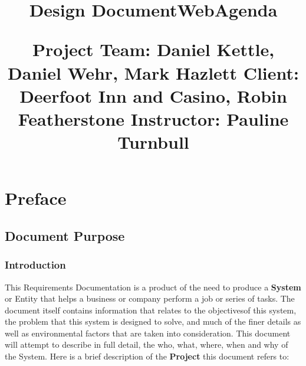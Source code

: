\documentclass[letterpaper,12pt]{report}
\begin{document}
\title{Design Document\linebreak WebAgenda\linebreak \linebreak 
	\begin{small}\textbf{Project Team:} Daniel Kettle, Daniel Wehr, Mark Hazlett\linebreak
	\textbf{Client:} Deerfoot Inn and Casino, Robin Featherstone\linebreak
	\textbf{Instructor:} Pauline Turnbull\end{small}}

\author{}
\maketitle
\tableofcontents
\listoffigures

\part{Preface}
\chapter{Document Purpose}
\section{Introduction}
\hspace{1cm}This Requirements Documentation is a product of the need to produce a \textbf{System} or Entity that helps a business or company perform a job or series of tasks. The document itself contains information that relates to the objectives\space of this system, the problem that this system is designed to solve, and much of the finer details as well as environmental factors that are taken into consideration. This document will attempt to describe in full detail, the who, what, where, when and why of the System.
Here is a brief description of the \textbf{Project} this document refers to:
\end{document}
